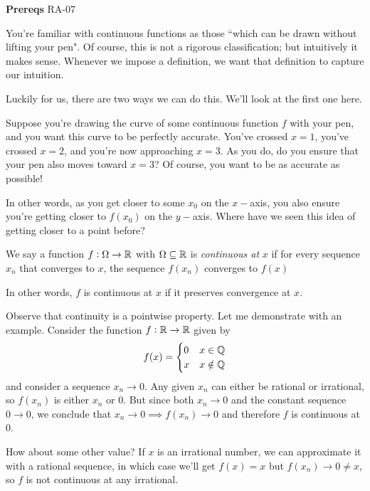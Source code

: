 

\textbf{Prereqs} RA-07

You're familiar with continuous functions as those ``which can be drawn without lifting your pen". Of course, this is not a rigorous classification; but intuitively it makes sense. Whenever we impose a definition, we want that definition to capture our intuition.

Luckily for us, there are two ways we can do this. We'll look at the first one here.

Suppose you're drawing the curve of some continuous function $f$ with your pen, and you want this curve to be perfectly accurate. You've crossed $x = 1$, you've crossed $x = 2$, and you're now approaching $x = 3$. As you do, do you ensure that your pen also moves toward $x = 3$? Of course, you want to be as accurate as possible!

In other words, as you get closer to some $x_0$ on the $x-$axis, you also ensure you're getting closer to $f(x_0)$ on the $y-$axis. Where have we seen this idea of getting closer to a point before?

\begin{SNP}{\dfn}{We say a function $f: \Omega \rightarrow \mathbb{R}$ with $\Omega \subseteq \mathbb{R}$ is \emph{continuous at} $x$ if for every sequence $x_n$ that converges to $x$, the sequence $f(x_n)$ converges to $f(x)$}
\end{SNP}

In other words, $f$ is continuous at $x$ if it preserves convergence at $x$.

Observe that continuity is a pointwise property. Let me demonstrate with an example. Consider the function $f: \mathbb{R} \rightarrow \mathbb{R}$ given by
$$
f(x) = \begin{cases}
	0 & x \in \mathbb{Q}\\
	x & x \notin \mathbb{Q}
\end{cases}
$$
and consider a sequence $x_n \rightarrow 0$. Any given $x_n$ can either be rational or irrational, so $f(x_n)$ is either $x_n$ or $0$. But since both $x_n \rightarrow 0$ and the constant sequence $0 \rightarrow 0$, we conclude that $x_n \rightarrow 0 \implies f(x_n) \rightarrow 0$ and therefore $f$ is continuous at $0$.

How about some other value? If $x$ is an irrational number, we can approximate it with a rational sequence, in which case we'll get $f(x) = x$ but $f(x_n) \rightarrow 0 \neq x$, so $f$ is not continuous at any irrational.

